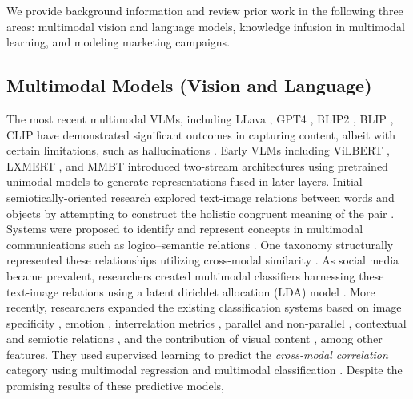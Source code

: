 We provide background information and review prior work in the following three areas: multimodal vision and language models, knowledge infusion in multimodal learning, and modeling marketing campaigns. 


\vspace{-3mm}
\subsection{Multimodal Models (Vision and Language)}
\label{sec:multimodal-transformers}
\vspace{-1mm}

The most recent multimodal VLMs, including LLava \cite{liu2023visual}, GPT4 \cite{openai2023gpt4}, BLIP2 \cite{li2023blip}, BLIP \cite{li2022blip}, CLIP \cite{radford2021learning} have demonstrated significant outcomes in capturing content, albeit with certain limitations, such as hallucinations \cite{li2023evaluating,cirik2022holm}. Early VLMs including ViLBERT \cite{lu2019vilbert}, LXMERT \cite{tan2019lxmert}, and MMBT \cite{kiela2019supervised} introduced two-stream architectures using pretrained unimodal models to generate representations fused in later layers. Initial semiotically-oriented research explored text-image relations between 
words and objects 
by attempting to construct the holistic congruent meaning of the pair \cite{wu2014multimodal,manning1998understanding}. %
Systems were proposed to identify and represent concepts in multimodal communications such as logico–semantic relations \cite{martinec2005system}. One taxonomy 
structurally represented these relationships utilizing cross-modal similarity \cite{marsh2003taxonomy}. As social media became prevalent, researchers created multimodal classifiers harnessing these text-image relations using a latent dirichlet allocation (LDA) model \cite{wang2014bilateral,chen2013understanding}.  
More recently, researchers expanded the existing classification systems based on image specificity \cite{jas2015image}, emotion \cite{chen2015velda}, interrelation metrics \cite{henning2017estimating,otto2020characterization}, parallel and non-parallel \cite{zhang2018equal}, contextual and semiotic relations \cite{kruk2019integrating}, and the contribution of visual content \cite{vempala2019categorizing},  among other features. They used supervised learning to predict the \emph{cross-modal correlation} category using multimodal regression \cite{jas2015image} and multimodal classification \cite{chen2015velda,henning2017estimating,otto2020characterization,zhang2018equal,kruk2019integrating,vempala2019categorizing}. Despite the promising results of these predictive models, 

